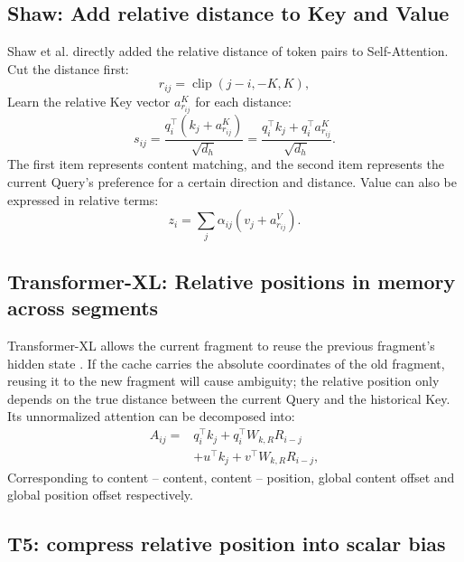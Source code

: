 \documentclass[UTF8,fontset=none,a4paper,10pt]{ctexart}
\begin{document}
\subsection{Shaw: Add relative distance to Key and Value}

Shaw et al. directly added the relative distance of token pairs to Self-Attention\cite{en:shaw2018}. Cut the distance first:
\begin{equation}
  r_{ij}=\operatorname{clip}(j-i,-K,K),
  \label{en:eq:clip}
\end{equation}
Learn the relative Key vector $a^K_{r_{ij}}$ for each distance:
\begin{equation}
  s_{ij}=\frac{q_i^\top(k_j+a^K_{r_{ij}})}{\sqrt{d_h}}
  =\frac{q_i^\top k_j+q_i^\top a^K_{r_{ij}}}{\sqrt{d_h}}.
  \label{en:eq:shaw-score}
\end{equation}
The first item represents content matching, and the second item represents the current Query's preference for a certain direction and distance. Value can also be expressed in relative terms:
\begin{equation}
  z_i=\sum_j\alpha_{ij}(v_j+a^V_{r_{ij}}).
  \label{en:eq:shaw-value}
\end{equation}

\subsection{Transformer-XL: Relative positions in memory across segments}

Transformer-XL allows the current fragment to reuse the previous fragment's hidden state \cite{en:dai2019}. If the cache carries the absolute coordinates of the old fragment, reusing it to the new fragment will cause ambiguity; the relative position only depends on the true distance between the current Query and the historical Key. Its unnormalized attention can be decomposed into:
\begin{equation}
  \begin{aligned}
  A_{ij}={}&q_i^\top k_j+q_i^\top W_{k,R}R_{i-j}\\
           &+u^\top k_j+v^\top W_{k,R}R_{i-j},
  \end{aligned}
  \label{en:eq:txl}
\end{equation}
Corresponding to content -- content, content -- position, global content offset and global position offset respectively.

\subsection{T5: compress relative position into scalar bias}
\end{document}

